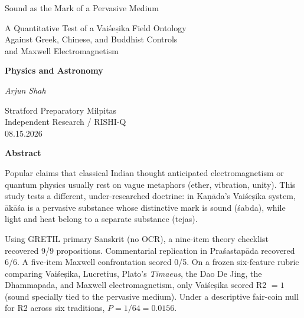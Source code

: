 \documentclass[12pt]{article}
\newcommand{\Vais}{Vaiśeṣika}
\newcommand{\Kanada}{Kaṇāda}
\newcommand{\akasa}{ākāśa}
\newcommand{\sabda}{śabda}
\newcommand{\Pras}{Praśastapāda}
\begin{document}
\setcounter{page}{1}

\thispagestyle{fancy}
{}

\noindent
{\fontsize{22}{26}\selectfont
Sound as the Mark of a Pervasive Medium\par}

\vspace{0.55em}
\noindent
{\fontsize{14}{18}\selectfont
A Quantitative Test of a \Vais{} Field Ontology\\[0.12em]
Against Greek, Chinese, and Buddhist Controls\\[0.12em]
and Maxwell Electromagnetism\par}

\vspace{0.85em}
\noindent\textbf{Physics and Astronomy}

\vspace{0.35em}
\noindent\textit{Arjun Shah}

\vfill

\begin{flushright}
Stratford Preparatory Milpitas\\[0.15em]
Independent Research / RISHI-Q\\[0.15em]
08.15.2026
\end{flushright}

\newpage

{}
\tableofcontents
\newpage

{}
\begin{center}
{\normalsize\bfseries Abstract}
\end{center}
\vspace{0.55em}

\noindent
Popular claims that classical Indian thought anticipated electromagnetism or quantum physics usually rest on vague metaphors (ether, vibration, unity). This study tests a different, under-researched doctrine: in \Kanada's \Vais{} system, \akasa{} is a pervasive substance whose distinctive mark is sound (\sabda), while light and heat belong to a separate substance (tejas).

\vspace{0.85em}
\noindent
Using GRETIL primary Sanskrit (no OCR), a nine-item theory checklist recovered 9/9 propositions. Commentarial replication in \Pras{} recovered 6/6. A five-item Maxwell confrontation scored 0/5. On a frozen six-feature rubric comparing \Vais{}, Lucretius, Plato's \emph{Timaeus}, the Dao De Jing, the Dhammapada, and Maxwell electromagnetism, only \Vais{} scored R2 $= 1$ (sound specially tied to the pervasive medium). Under a descriptive fair-coin null for R2 across six traditions, $P=1/64=0.0156$.
\end{document}
